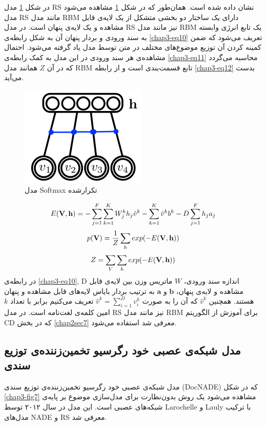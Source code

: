 	در شکل
	\ref{chap3-fig6}
	مدل
	RS
	نشان داده شده است. همان‌طور که در شکل
	\ref{chap3-fig6}
	مشاهده می‌‌شود مدل
	RS
	مانند مدل
RBM
	دارای یک ساختار دو بخشی متشکل از یک لایه‌ی قابل مشاهده و یک لایه‌ی پنهان است. در مدل
	RS
	نیز مانند مدل
	RBM
	یک تابع انرژی وابسته به سند ورودی و بردار پنهان آن به شکل رابطه‌ی
	\ref{chap3-eq10}
	تعریف می‌‌شود که ضمن کمینه کردن آن توزیع موضوع‌های مختلف در متن توسط مدل یاد گرفته می‌‌شود. احتمال مشاهده‌ی هر سند ورودی در این مدل به کمک رابطه‌ی
	\ref{chap3-eq11}
	محاسبه می‌‌گردد که در آن
	$Z$
	همانند مدل
	RBM
	تابع قسمت‌بندی است و از رابطه
	\ref{chap3-eq12}
	بدست می‌‌آید.
	\begin{figure}[!t]
		\centering
		\includegraphics[scale=0.4]{chap3-img/RS}
		\caption{مدل Softmax تکرارشده \cite{hinton2009replicated}}
		\label{chap3-fig6}
	\end{figure}	
	\begin{align}
	\centering
	\label{chap3-eq10}
	E(\textbf{V},\textbf{h}) = -\sum_{j=1}^{F} \sum_{k=1}^{K} W_j^k h_j \hat{v}^k - \sum_{k=1}^K \hat{v}^k b^k -D\sum_{j=1}^F h_ja_j
	\end{align}
	\begin{align}
	\centering
	\label{chap3-eq11}
	p(\textbf{V}) = \dfrac{1}{Z}\sum_{h}exp(-E(\textbf{V},\textbf{h}))
	\end{align}	
	\begin{align}
	\centering
	\label{chap3-eq12}
	Z = \sum_{V}\sum_{h}exp(-E(\textbf{V},\textbf{h}))
	\end{align}
	در رابطه‌ی
	\ref{chap3-eq10}, D
	اندازه سند ورودی،
	$W$
	ماتریس وزن بین لایه‌ی قابل مشاهده و لایه‌ی پنهان،
	$\textbf{b}$
	و
	$\textbf{a}$
	به ترتیب بردار بایاس لایه‌های قابل مشاهده و پنهان هستند. همچنین
	$\hat{v}^k$
	که آن را به صورت
	$\hat{v}^k = \sum_{i=1}^{D} v_i^k$
	 تعریف می‌‌کنیم برابر با تعداد
	$k$امین 
	کلمه‌ی لغت‌نامه است. در مدل
		RS
	نیز مانند مدل
	RBM
	برای آموزش از الگوریتم
	CD
	که در بخش
	\ref{chap2sec7}
	معرفی شد استفاده می‌‌شود.
		 
	\subsection{مدل شبکه‌‌ی عصبی خود رگرسیو تخمین‌زننده‌ی توزیع سندی}
	\label{chap3sec3sub6}
مدل شبکه‌‌ی عصبی خود رگرسیو تخمین‌زننده‌ی توزیع سندی
(DocNADE)
که در شکل
\ref{chap3-fig7}
مشاهده می‌‌شود یک روش بدون‌نظارت برای مدل‌سازی موضوع بر پایه‌ی شبکه‌های عصبی است. این مدل در سال ۲۰۱۲ توسط
Larochelle
و
Lauly \cite{larochelle2012neural}
با ترکیب مدل‌های
NADE
و
RS
معرفی‌ شد.

